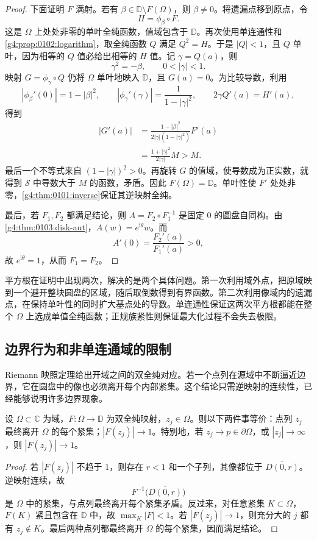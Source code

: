 \begin{proof}
	下面证明 \(F\) 满射。若有 \(\beta\in\mathbb D\setminus F(\Omega)\)，则 \(\beta\ne0\)。将遗漏点移到原点，令
	\[
		H=\phi_\beta\circ F.
	\]
	这是 \(\Omega\) 上处处非零的单叶全纯函数，值域包含于 \(\mathbb D\)。再次使用单连通性和\cref{g4:prop:0102:logarithm}，取全纯函数 \(Q\) 满足 \(Q^2=H\)。于是 \(|Q|<1\)，且 \(Q\) 单叶，因为相等的 \(Q\) 值必给出相等的 \(H\) 值。记 \(\gamma=Q(a)\)，则
	\[
		\gamma^2=-\beta,\qquad 0<|\gamma|<1.
	\]
	映射 \(G=\phi_\gamma\circ Q\) 仍将 \(\Omega\) 单叶地映入 \(\mathbb D\)，且 \(G(a)=0\)。为比较导数，利用
	\[
		|\phi_\beta'(0)|=1-|\beta|^2,
		\qquad |\phi_\gamma'(\gamma)|=\frac1{1-|\gamma|^2},
		\qquad 2\gamma Q'(a)=H'(a),
	\]
	得到
	\begin{align*}
		|G'(a)|
		&=\frac{1-|\beta|^2}{2|\gamma|(1-|\gamma|^2)}F'(a)\\
		&=\frac{1+|\gamma|^2}{2|\gamma|}M
		>M.
	\end{align*}
	最后一个不等式来自 \((1-|\gamma|)^2>0\)。再旋转 \(G\) 的值域，使导数成为正实数，就得到 \(\mathcal S\) 中导数大于 \(M\) 的函数，矛盾。因此 \(F(\Omega)=\mathbb D\)。单叶性使 \(F'\) 处处非零，\cref{g4:thm:0101:inverse}保证其逆映射全纯。

	最后，若 \(F_1,F_2\) 都满足结论，则 \(A=F_2\circ F_1^{-1}\) 是固定 \(0\) 的圆盘自同构。由\cref{g4:thm:0103:disk-aut}，\(A(w)=e^{\mathrm i\theta}w\)。而
	\[
		A'(0)=\frac{F_2'(a)}{F_1'(a)}>0,
	\]
	故 \(e^{\mathrm i\theta}=1\)，从而 \(F_1=F_2\)。
\end{proof}

平方根在证明中出现两次，解决的是两个具体问题。第一次利用域外点，把原域映到一个避开整块圆盘的区域，随后取倒数得到有界函数。第二次利用像域内的遗漏点，在保持单叶性的同时扩大基点处的导数。单连通性保证这两次平方根都能在整个 \(\Omega\) 上选成单值全纯函数；正规族紧性则保证最大化过程不会失去极限。

\subsection{边界行为和非单连通域的限制}
\label{g4:subsec:0104:04}

Riemann 映照定理给出开域之间的双全纯对应。若一个点列在源域中不断逼近边界，它在圆盘中的像也必须离开每个内部紧集。这个结论只需逆映射的连续性，已经能够说明许多边界现象。

\begin{proposition}\label{g4:prop:0104:boundary-escape}
	设 \(\Omega\subset\mathbb C\) 为域，\(F:\Omega\to\mathbb D\) 为双全纯映射，\(z_j\in\Omega\)。则以下两件事等价：点列 \(z_j\) 最终离开 \(\Omega\) 的每个紧集；\(|F(z_j)|\to1\)。特别地，若 \(z_j\to p\in\partial\Omega\)，或 \(|z_j|\to\infty\)，则 \(|F(z_j)|\to1\)。
\end{proposition}
\begin{proof}
	若 \(|F(z_j)|\) 不趋于 \(1\)，则存在 \(r<1\) 和一个子列，其像都位于 \(\overline{D(0,r)}\)。逆映射连续，故
	\[
		F^{-1}\bigl(\overline{D(0,r)}\bigr)
	\]
	是 \(\Omega\) 中的紧集，与点列最终离开每个紧集矛盾。反过来，对任意紧集 \(K\subset\Omega\)，\(F(K)\) 紧且包含在 \(\mathbb D\) 中，故 \(\max_K|F|<1\)。若 \(|F(z_j)|\to1\)，则充分大的 \(j\) 都有 \(z_j\notin K\)。最后两种点列都最终离开 \(\Omega\) 的每个紧集，因而满足结论。
\end{proof}

